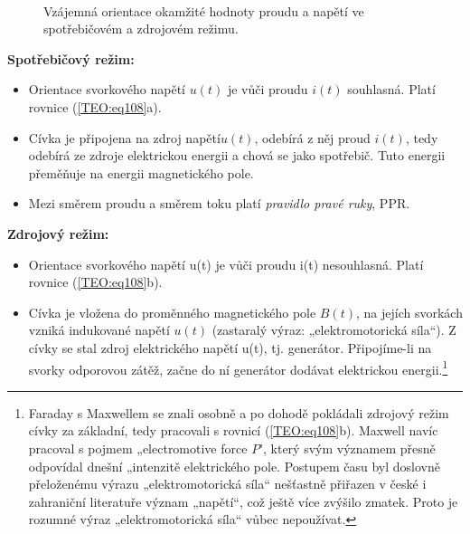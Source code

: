     \begin{figure}[ht!]
      \centering  
        {}                    
        {}         \\               
        {}
      \caption{Vzájemná orientace okamžité hodnoty proudu a napětí ve spotřebičovém a zdrojovém 
               režimu.} 
      \label{teo:fig039}
    \end{figure}
        
    \textbf{Spotřebičový režim:}
    \begin{itemize}[noitemsep]
      \item Orientace svorkového napětí \(u(t)\) je vůči proudu \(i(t)\) souhlasná. Platí rovnice
            (\ref{TEO:eq108}a).
      \item Cívka je připojena na zdroj napětí\(u(t)\), odebírá z něj proud \(i(t)\), tedy odebírá
            ze zdroje elektrickou energii a chová se jako spotřebič. Tuto energii přeměňuje na
            energii magnetického pole.
      \item Mezi směrem proudu a směrem toku platí \emph{pravidlo pravé ruky}, PPR.           
    \end{itemize}
    
    \textbf{Zdrojový režim:}
    \begin{itemize}[noitemsep]
      \item Orientace svorkového napětí u(t) je vůči proudu i(t) nesouhlasná. Platí rovnice
            (\ref{TEO:eq108}b).
      \item Cívka je vložena do proměnného magnetického pole \(B(t)\), na jejích svorkách vzniká
            indukované napětí \(u(t)\) (zastaralý výraz: „elektromotorická síla“). Z cívky se stal
            zdroj elektrického napětí u(t), tj. generátor. Připojíme-li na svorky odporovou zátěž,
            začne do ní generátor dodávat elektrickou energii.\footnote{Faraday s Maxwellem se znali
            osobně a po dohodě pokládali zdrojový režim cívky za základní, tedy pracovali s rovnicí
            (\ref{TEO:eq108}b). Maxwell navíc pracoval s pojmem „electromotive force \(P\)', který
            svým významem přesně odpovídal dnešní „intenzitě elektrického pole. Postupem času byl
            doslovně přeloženému výrazu „elektromotorická síla“ nešťastně přiřazen v české i
            zahraniční literatuře význam „napětí“, což ještě více zvýšilo zmatek. Proto je rozumné
            výraz „elektromotorická síla“ vůbec nepoužívat.}
    \end{itemize}

